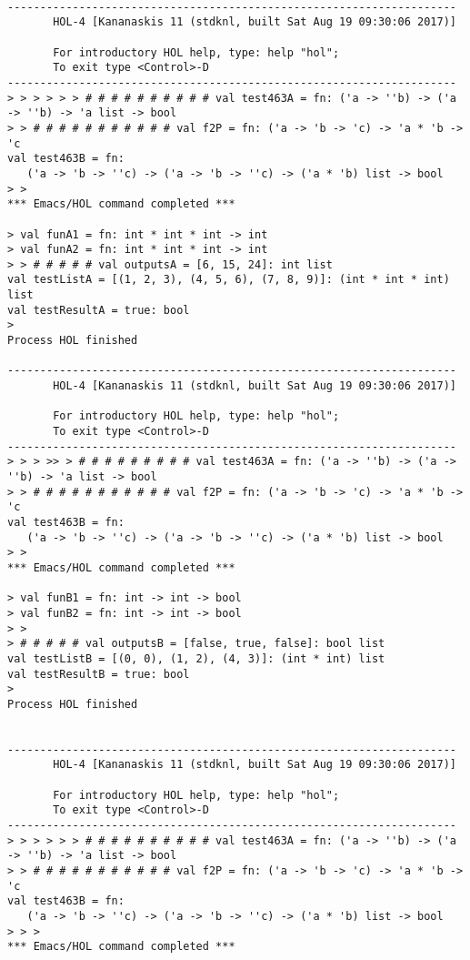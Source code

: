 \documentclass{report}
\begin{document}
\begin{session}
  \begin{scriptsize}
\begin{verbatim}

---------------------------------------------------------------------
       HOL-4 [Kananaskis 11 (stdknl, built Sat Aug 19 09:30:06 2017)]

       For introductory HOL help, type: help "hol";
       To exit type <Control>-D
---------------------------------------------------------------------
> > > > > > # # # # # # # # # # val test463A = fn: ('a -> ''b) -> ('a -> ''b) -> 'a list -> bool
> > # # # # # # # # # # # val f2P = fn: ('a -> 'b -> 'c) -> 'a * 'b -> 'c
val test463B = fn:
   ('a -> 'b -> ''c) -> ('a -> 'b -> ''c) -> ('a * 'b) list -> bool
> > 
*** Emacs/HOL command completed ***

> val funA1 = fn: int * int * int -> int
> val funA2 = fn: int * int * int -> int
> > # # # # # val outputsA = [6, 15, 24]: int list
val testListA = [(1, 2, 3), (4, 5, 6), (7, 8, 9)]: (int * int * int) list
val testResultA = true: bool
> 
Process HOL finished

---------------------------------------------------------------------
       HOL-4 [Kananaskis 11 (stdknl, built Sat Aug 19 09:30:06 2017)]

       For introductory HOL help, type: help "hol";
       To exit type <Control>-D
---------------------------------------------------------------------
> > > >> > # # # # # # # # # val test463A = fn: ('a -> ''b) -> ('a -> ''b) -> 'a list -> bool
> > # # # # # # # # # # # val f2P = fn: ('a -> 'b -> 'c) -> 'a * 'b -> 'c
val test463B = fn:
   ('a -> 'b -> ''c) -> ('a -> 'b -> ''c) -> ('a * 'b) list -> bool
> > 
*** Emacs/HOL command completed ***

> val funB1 = fn: int -> int -> bool
> val funB2 = fn: int -> int -> bool
> > 
> # # # # # val outputsB = [false, true, false]: bool list
val testListB = [(0, 0), (1, 2), (4, 3)]: (int * int) list
val testResultB = true: bool
> 
Process HOL finished


---------------------------------------------------------------------
       HOL-4 [Kananaskis 11 (stdknl, built Sat Aug 19 09:30:06 2017)]

       For introductory HOL help, type: help "hol";
       To exit type <Control>-D
---------------------------------------------------------------------
> > > > > > # # # # # # # # # # val test463A = fn: ('a -> ''b) -> ('a -> ''b) -> 'a list -> bool
> > # # # # # # # # # # # val f2P = fn: ('a -> 'b -> 'c) -> 'a * 'b -> 'c
val test463B = fn:
   ('a -> 'b -> ''c) -> ('a -> 'b -> ''c) -> ('a * 'b) list -> bool
> > > 
*** Emacs/HOL command completed ***


\end{verbatim}
\end{scriptsize}
\end{session}
\end{document}
